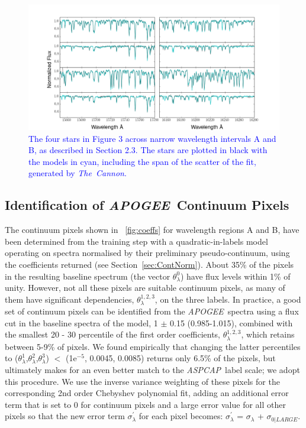 \documentclass[12pt, preprint]{aastex}
\newcommand{\sectionname}{Section}
\newcommand{\tc}{\textsl{The~Cannon}}
\newcommand{\apogee}{\textsl{APOGEE}}
\newcommand{\aspcap}{\textsl{ASPCAP}}
\begin{document}
\begin{figure}[!h]
\centering
 \includegraphics[scale=0.4]{./plots/aftersubmit/data_model_cyan.png}
\caption{\textcolor{blue}{The four stars in Figure 3 across narrow wavelength intervals A and B, as described in Section 2.3. The stars are plotted in black with the models in cyan, including the span of the scatter of the fit, generated by \tc.}}
\label{fig:modeldata}
\end{figure}



\subsection{Identification of \apogee\ Continuum Pixels}
\label{sec:ApogeeContinuum}


The continuum pixels shown in \figurename~\ref{fig:coeffs} for wavelength regions A and B, 
have been determined from the training step with a quadratic-in-labels model operating on spectra normalised by their preliminary pseudo-continuum, using the coefficients returned (see \sectionname~\ref{sec:ContNorm}). About 35\% of the pixels in the resulting baseline spectrum  (the vector $\theta^0_\lambda$) have flux levels within 1\% of unity. However, not all these pixels are suitable continuum pixels, as many of them have significant dependencies,  $\theta^{1,2,3}_\lambda$,  on the three labels. In practice, a good set of continuum pixels can be identified from the \apogee\ spectra using a flux cut in the baseline spectra of the model, 1 $\pm$ 0.15 (0.985-1.015), combined with the smallest 20 - 30 percentile of the first order coefficients, $\theta^{1,2,3}_\lambda$,  which retains between 5-9\% of pixels. We found empirically that changing the latter percentiles to ($\theta^{1}_\lambda$,$\theta^{2}_\lambda$,$\theta^{3}_\lambda$) $<$ (1e$^{-5}$, 0.0045, 0.0085) returns only 6.5\% of the pixels, but ultimately makes for an even  better match to the \aspcap\ label scale; we adopt this procedure. We use the inverse variance weighting of these pixels for the corresponding 2nd order Chebyshev polynomial fit, adding an additional error term that is set to 0 for continuum pixels and a large error value for all other pixels so that the new error term $\sigma^{'}_\lambda$ for each pixel becomes:
$\sigma^{'}_\lambda$ = $\sigma_\lambda$ + $\sigma_{0|LARGE}$. 
\end{document}
